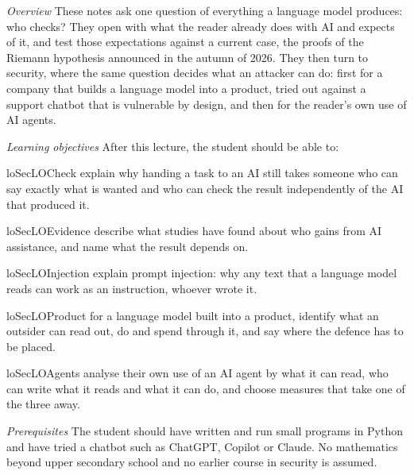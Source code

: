 
\emph{Overview}
These notes ask one question of everything a language model produces: who
checks?
They open with what the reader already does with AI and expects of it,
and test those expectations against a current case, the proofs of the
Riemann hypothesis announced in the autumn of 2026.
They then turn to security, where the same question decides what an
attacker can do: first for a company that builds a language model into a
product, tried out against a support chatbot that is vulnerable by
design, and then for the reader's own use of AI agents.

\emph{Learning objectives}
After this lecture, the student should be able to:
\begin{restatable}{lo}{SecLOCheck}\label{SecLOCheck}%
  explain why handing a task to an AI still takes someone who can say
  exactly what is wanted and who can check the result independently of
  the AI that produced it.
\end{restatable}
\begin{restatable}{lo}{SecLOEvidence}\label{SecLOEvidence}%
  describe what studies have found about who gains from AI assistance,
  and name what the result depends on.
\end{restatable}
\begin{restatable}{lo}{SecLOInjection}\label{SecLOInjection}%
  explain prompt injection: why any text that a language model reads can
  work as an instruction, whoever wrote it.
\end{restatable}
\begin{restatable}{lo}{SecLOProduct}\label{SecLOProduct}%
  for a language model built into a product, identify what an outsider
  can read out, do and spend through it, and say where the defence has
  to be placed.
\end{restatable}
\begin{restatable}{lo}{SecLOAgents}\label{SecLOAgents}%
  analyse their own use of an AI agent by what it can read, who can
  write what it reads and what it can do, and choose measures that take
  one of the three away.
\end{restatable}

\emph{Prerequisites}
The student should have written and run small programs in Python and
have tried a chatbot such as ChatGPT, Copilot or Claude.
No mathematics beyond upper secondary school and no earlier course in
security is assumed.
